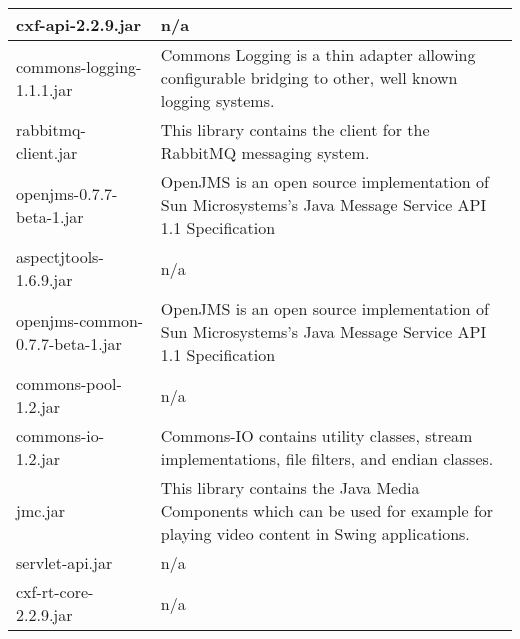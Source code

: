 \begin{center}
\begin{longtable}{|p{}|p{}|}
\hline 
cxf-api-2.2.9.jar & n/a\\
\hline 
commons-logging-1.1.1.jar & Commons Logging is a thin adapter allowing configurable bridging to other, well known logging systems.\\
\hline 
rabbitmq-client.jar & This library contains the client for the RabbitMQ messaging system.\\
\hline 
openjms-0.7.7-beta-1.jar & OpenJMS is an open source implementation of Sun Microsystems's Java Message Service API 1.1 Specification\\
\hline 
aspectjtools-1.6.9.jar & n/a\\
\hline 
openjms-common-0.7.7-beta-1.jar & OpenJMS is an open source implementation of Sun Microsystems's Java Message Service API 1.1 Specification\\
\hline 
commons-pool-1.2.jar & n/a\\
\hline 
commons-io-1.2.jar & Commons-IO contains utility classes, stream implementations, file filters, and endian classes.\\
\hline 
jmc.jar & This library contains the Java Media Components which can be used for example for playing video content in Swing applications.\\
\hline 
servlet-api.jar & n/a\\
\hline 
cxf-rt-core-2.2.9.jar & n/a\\
\hline 
\end{longtable}
\label{tabular:libraries}
\end{center}
